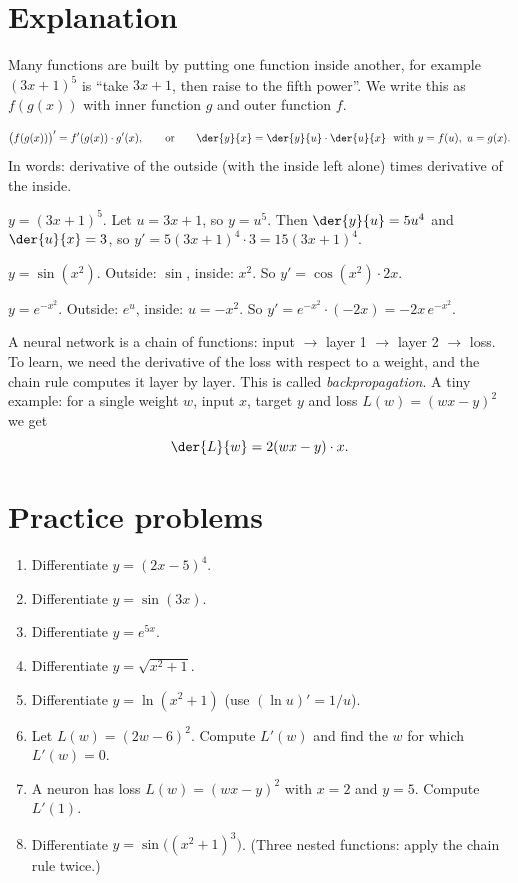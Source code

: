 \label{ch:chain}

\section*{Explanation}
Many functions are built by putting one function inside another, for example $(3x+1)^5$ is ``take $3x+1$, then raise to the fifth power''. We write this as $f(g(x))$ with inner function $g$ and outer function $f$.

\begin{keyidea}
\[
\bigl(f(g(x))\bigr)'=f'(g(x))\cdot g'(x),
\qquad\text{or}\qquad
\der{y}{x}=\der{y}{u}\cdot\der{u}{x}\ \ \text{with } y=f(u),\ u=g(x).
\]
In words: derivative of the outside (with the inside left alone) times derivative of the inside.
\end{keyidea}

\begin{example}
$y=(3x+1)^5$. Let $u=3x+1$, so $y=u^5$. Then $\der{y}{u}=5u^4$ and $\der{u}{x}=3$, so $y'=5(3x+1)^4\cdot 3=15(3x+1)^4$.
\end{example}

\begin{example}
$y=\sin(x^2)$. Outside: $\sin$, inside: $x^2$. So $y'=\cos(x^2)\cdot 2x$.
\end{example}

\begin{example}
$y=e^{-x^2}$. Outside: $e^u$, inside: $u=-x^2$. So $y'=e^{-x^2}\cdot(-2x)=-2x\,e^{-x^2}$.
\end{example}

\begin{aibox}
A neural network is a chain of functions: input $\to$ layer 1 $\to$ layer 2 $\to$ loss. To learn, we need the derivative of the loss with respect to a weight, and the chain rule computes it layer by layer. This is called \emph{backpropagation}. A tiny example: for a single weight $w$, input $x$, target $y$ and loss $L(w)=(wx-y)^2$ we get
\[
\der{L}{w}=2(wx-y)\cdot x.
\]
\end{aibox}

\section*{Practice problems}
\begin{enumerate}[label=\textbf{\thechapter.\arabic*}]
  \item Differentiate $y=(2x-5)^4$.
  \item Differentiate $y=\sin(3x)$.
  \item Differentiate $y=e^{5x}$.
  \item Differentiate $y=\sqrt{x^2+1}$.
  \item Differentiate $y=\ln(x^2+1)$ (use $(\ln u)'=1/u$).
  \item Let $L(w)=(2w-6)^2$. Compute $L'(w)$ and find the $w$ for which $L'(w)=0$.
  \item A neuron has loss $L(w)=(wx-y)^2$ with $x=2$ and $y=5$. Compute $L'(1)$.
  \item[\textbf{\thechapter.8}$\star$] Differentiate $y=\sin\bigl((x^2+1)^3\bigr)$. (Three nested functions: apply the chain rule twice.)
\end{enumerate}


